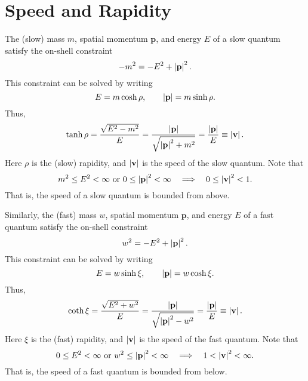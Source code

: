 \section{Speed and Rapidity}
The (slow) mass $m$, spatial momentum $\mathbf{p}$, and energy $E$ of a slow quantum satisfy the on-shell constraint
\begin{equation}
	{-m^{2}} = {-E^{2}} + \left\lvert \mathbf{p} \right\rvert^{2}.
\end{equation}
This constraint can be solved by writing
\begin{equation}
	E = m \operatorname{cosh}{\rho}, \qquad \left\lvert \mathbf{p} \right\rvert = m \operatorname{sinh}{\rho}.
\end{equation}
Thus,
\begin{equation}
	\operatorname{tanh}{\rho} = \frac{\sqrt{E^{2} - m^{2}}}{E} = \frac{\left\lvert \mathbf{p} \right\rvert}{\sqrt{\left\lvert \mathbf{p} \right\rvert^{2} + m^{2}}} = \frac{\left\lvert \mathbf{p} \right\rvert}{E} \equiv \left\lvert \mathbf{v} \right\rvert.
\end{equation}
Here $\rho$ is the (slow) rapidity, and $\left\lvert \mathbf{v} \right\rvert$ is the speed of the slow quantum. Note that
\begin{equation}
	m^{2} \leq E^{2} < \infty \text{ or } 0 \leq \left\lvert \mathbf{p} \right\rvert^{2} < \infty \quad \Longrightarrow \quad 0 \leq \left\lvert \mathbf{v} \right\rvert^{2} < 1.
\end{equation}
That is, the speed of a slow quantum is bounded from above.

Similarly, the (fast) mass $w$, spatial momentum $\mathbf{p}$, and energy $E$ of a fast quantum satisfy the on-shell constraint
\begin{equation}
	{w^{2}} = {-E^{2}} + \left\lvert \mathbf{p} \right\rvert^{2}.
\end{equation}
This constraint can be solved by writing
\begin{equation}
	E = w \operatorname{sinh}{\xi}, \qquad \left\lvert \mathbf{p} \right\rvert = w \operatorname{cosh}{\xi}.
\end{equation}
Thus,
\begin{equation}
	\operatorname{coth}{\xi} = \frac{\sqrt{E^{2} + w^{2}}}{E} = \frac{\left\lvert \mathbf{p} \right\rvert}{\sqrt{\left\lvert \mathbf{p} \right\rvert^{2} - w^{2}}} = \frac{\left\lvert \mathbf{p} \right\rvert}{E} \equiv \left\lvert \mathbf{v} \right\rvert.
\end{equation}
Here $\xi$ is the (fast) rapidity, and $\left\lvert \mathbf{v} \right\rvert$ is the speed of the fast quantum. Note that
\begin{equation}
	0 \leq E^{2} < \infty \text{ or } w^{2} \leq \left\lvert \mathbf{p} \right\rvert^{2} < \infty \quad \Longrightarrow \quad 1 < \left\lvert \mathbf{v} \right\rvert^{2} < \infty.
\end{equation}
That is, the speed of a fast quantum is bounded from below.

